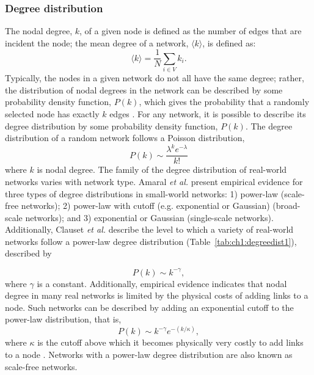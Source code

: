 \subsubsection{Degree distribution}
\label{sec:ch1:networkreliability:networktopology:degreedist}

The nodal degree, $k$, of a given node is defined as the number of edges that are incident the node; the mean degree of a network, $\langle k \rangle$, is defined as:
%
\begin{equation}
\langle k\rangle=\frac{1}{N}\sum\limits_{i \in V}k_{i}.
\end{equation}
%
Typically, the nodes in a given network do not all have the same degree; rather, the distribution of nodal degrees in the network can be described by some probability density function, $P(k)$, which gives the probability that a randomly selected node has exactly $k$ edges \cite{Albert2002}. For any network, it is possible to describe its degree distribution by some probability density function, $P(k)$.  The degree distribution of a random network follows a Poisson distribution, 
%
\begin{equation}
P(k) \sim \frac{\lambda^{k}e^{-\lambda}}{k!}
\end{equation}
%
where $k$ is nodal degree.  The family of the degree distribution of real-world networks varies with network type.  Amaral \emph{et al.} \cite{Amaral2000} present empirical evidence for three types of degree distributions in small-world networks: 1) power-law (scale-free networks); 2) power-law with cutoff (e.g. exponential or Gaussian) (broad-scale networks); and 3) exponential or Gaussian (single-scale networks).  Additionally, Clauset \emph{et al.} \cite{Clauset2009} describe the level to which a variety of real-world networks follow a power-law degree distribution (Table~\ref{tab:ch1:degreedist1}), described by

\begin{equation}
P(k) \sim k^{-\gamma}, 
\end{equation}
%
where $\gamma$ is a constant. Additionally, empirical evidence indicates that nodal degree in many real networks is limited by the physical costs of adding links to a node. Such networks can be described by adding an exponential cutoff to the power-law distribution, that is,
%
\begin{equation}
P(k) \sim k^{-\gamma}e^{-(k/\kappa)},
\end{equation}
%
where $\kappa$ is the cutoff above which it becomes physically very costly to add links to a node \cite{Jeong2000, Newman2001, Clauset2009, Amaral2000}. Networks with a power-law degree distribution are also known as scale-free networks.

